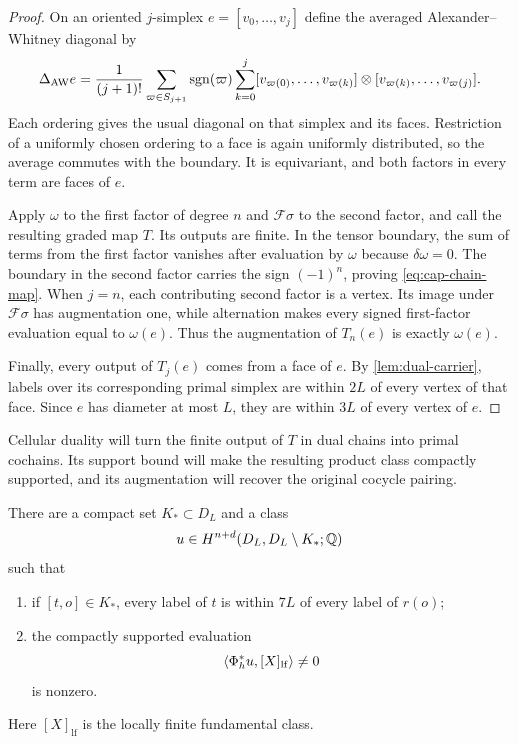 \begin{proof}
On an oriented $j$-simplex $e=[v_0,\ldots,v_j]$ define the averaged
Alexander--Whitney diagonal by
\[
 \Delta_{\mathrm{AW}}e
 =\frac1{(j+1)!}\sum_{\varpi\in S_{j+1}}\operatorname{sgn}(\varpi)
   \sum_{k=0}^j
 [v_{\varpi(0)},\ldots,v_{\varpi(k)}]
 \otimes[v_{\varpi(k)},\ldots,v_{\varpi(j)}].
\]
Each ordering gives the usual diagonal on that simplex and its faces.
Restriction of a uniformly chosen ordering to a face is again uniformly
distributed, so the average commutes with the boundary. It is equivariant,
and both factors in every term are faces of $e$.

Apply $\omega$ to the first factor of degree $n$ and $\mathcal F\sigma$
to the second factor, and call the resulting graded map $T$. Its outputs
are finite. In the tensor boundary, the sum of terms from the first factor
vanishes after evaluation by $\omega$ because $\delta\omega=0$. The boundary in the
second factor carries the sign $(-1)^n$, proving
\eqref{eq:cap-chain-map}. When $j=n$, each contributing second factor is a
vertex. Its image under $\mathcal F\sigma$ has augmentation one, while
alternation makes every signed first-factor evaluation equal to $\omega(e)$.
Thus the augmentation of $T_n(e)$ is exactly $\omega(e)$.

Finally, every output of $T_j(e)$ comes from a face of $e$. By
\cref{lem:dual-carrier}, labels over its corresponding primal simplex are
within $2L$ of every vertex of that face. Since $e$ has diameter at most
$L$, they are within $3L$ of every vertex of $e$.
\end{proof}

Cellular duality will turn the finite output of $T$ in dual chains into primal
cochains. Its support bound will make the resulting product class compactly supported,
and its augmentation will recover the original cocycle pairing.

\begin{proposition}
\label{prop:compact-pairing}
There are a compact set $K_*\subset D_L$ and a class
\[
 u\in H^{n+d}(D_L,D_L\setminus K_*;\mathbb Q)
\]
such that
\begin{enumerate}
\item if $[t,o]\in K_*$, every label of $t$ is within $7L$ of
every label of $r(o)$;
\item the compactly supported evaluation
\begin{equation}
\label{eq:compact-pairing-nonzero}
 \langle\Phi_h^*u,[X]_{\mathrm{lf}}\rangle\ne0
\end{equation}
is nonzero.
\end{enumerate}
Here $[X]_{\mathrm{lf}}$ is the locally finite fundamental class.
\end{proposition}

